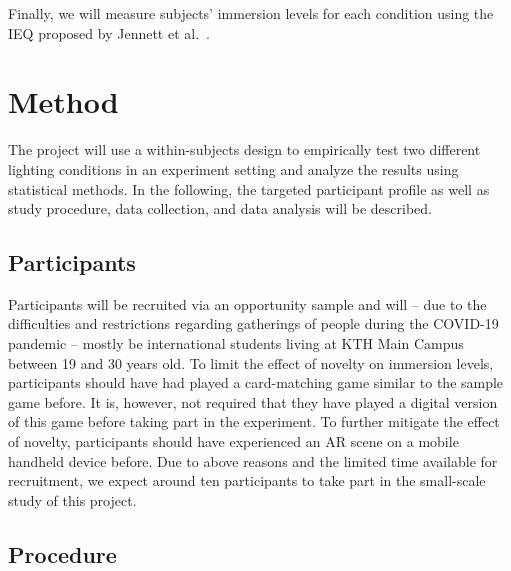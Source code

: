 \documentclass[12pt,twoside,english]{article}
\begin{document}
Finally, we will measure subjects' immersion levels for each condition using the \gls{IEQ} proposed by Jennett et al.~\cite{jennett_measuring_2008}.

\section{Method}
\label{sect:method}

The project will use a within-subjects design to empirically test two different lighting conditions in an experiment setting and analyze the results using statistical methods.
In the following, the targeted participant profile as well as study procedure, data collection, and data analysis will be described.

\subsection{Participants}
\label{sect:participants}

Participants will be recruited via an opportunity sample and will -- due to the difficulties and restrictions regarding gatherings of people during the COVID-19 pandemic -- mostly be international students living at KTH Main Campus between 19 and 30 years old.
To limit the effect of novelty on immersion levels, participants should have had played a card-matching game similar to the sample game before.
It is, however, not required that they have played a digital version of this game before taking part in the experiment.
To further mitigate the effect of novelty, participants should have experienced an \gls{AR} scene on a mobile handheld device before.
Due to above reasons and the limited time available for recruitment, we expect around ten participants to take part in the small-scale study of this project.

\subsection{Procedure}
\label{sect:procedure}
\end{document}
